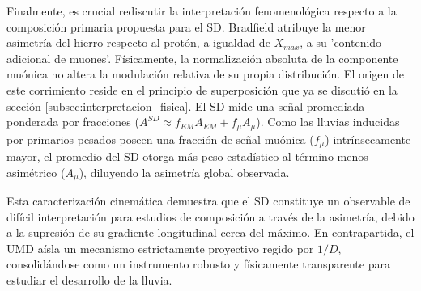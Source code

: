 Finalmente, es crucial rediscutir la interpretación fenomenológica respecto a la composición primaria propuesta para el SD. Bradfield atribuye la menor asimetría del hierro respecto al protón, a igualdad de $X_{max}$, a su 'contenido adicional de muones'. Físicamente, la normalización absoluta de la componente muónica no altera la modulación relativa de su propia distribución. El origen de este corrimiento reside en el principio de superposición que ya se discutió en la sección \ref{subsec:interpretacion_fisica}. El SD mide una señal promediada ponderada por fracciones ($A^{SD} \approx f_{EM} A_{EM} + f_{\mu} A_{\mu}$). Como las lluvias inducidas por primarios pesados poseen una fracción de señal muónica ($f_{\mu}$) intrínsecamente mayor, el promedio del SD otorga más peso estadístico al término menos asimétrico ($A_{\mu}$), diluyendo la asimetría global observada. 

Esta caracterización cinemática demuestra que el SD constituye un observable de difícil interpretación para estudios de composición a través de la asimetría, debido a la supresión de su gradiente longitudinal cerca del máximo. En contrapartida, el UMD aísla un mecanismo estrictamente proyectivo regido por $1/D$, consolidándose como un instrumento robusto y físicamente transparente para estudiar el desarrollo de la lluvia.

\newpage